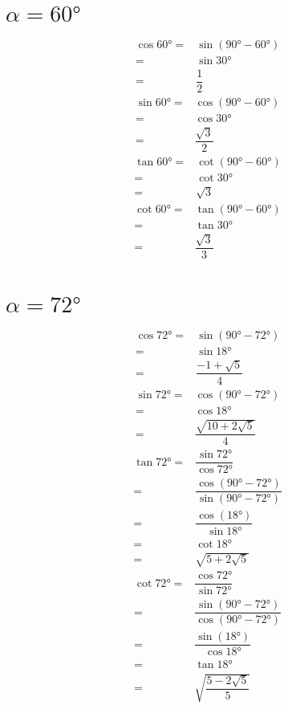 \section{$\alpha=\ang{60}$}
\begin{align*}
	\cos\ang{60}=&\sin(\ang{90}-\ang{60})\\
	=&\sin\ang{30}\\
	=&\dfrac{1}{2}
\end{align*}
\begin{align*}
	\sin\ang{60}=&\cos(\ang{90}-\ang{60})\\
	=&\cos\ang{30}\\
	=&\dfrac{\sqrt{3}}{2}
\end{align*}
\begin{align*}
	\tan\ang{60}=&\cot(\ang{90}-\ang{60})\\
	=&\cot\ang{30}\\
	=&\sqrt{3}
\end{align*}
\begin{align*}
	\cot\ang{60}=&\tan(\ang{90}-\ang{60})\\
	=&\tan\ang{30}\\
	=&\dfrac{\sqrt{3}}{3}\\
\end{align*}
\section{$\alpha=\ang{72}$}
\begin{align*}
	\cos\ang{72}=&\sin(\ang{90}-\ang{72})\\
	=&\sin\ang{18}\\
	=&\dfrac{-1+\sqrt{5}}{4}
\end{align*}
\begin{align*}
	\sin\ang{72}=&\cos(\ang{90}-\ang{72})\\
	=&\cos\ang{18}\\
	=&\dfrac{\sqrt{10+2\sqrt{5}}}{4}
\end{align*}
\begin{align*}
	\tan\ang{72}=&\dfrac{\sin\ang{72}}{\cos\ang{72}}\\
	=&\dfrac{\cos(\ang{90}-\ang{72})}{\sin(\ang{90}-\ang{72})}\\
	=&\dfrac{\cos(\ang{18})}{\sin\ang{18}}\\	
	=&\cot\ang{18}\\
	=&\sqrt{5+2\sqrt{5}}
\end{align*}
\begin{align*}
	\cot\ang{72}=&\dfrac{\cos\ang{72}}{\sin\ang{72}}\\
	=&\dfrac{\sin(\ang{90}-\ang{72})}{\cos(\ang{90}-\ang{72})}\\
	=&\dfrac{\sin(\ang{18})}{\cos\ang{18}}\\	
	=&\tan\ang{18}\\
	=&\sqrt{\dfrac{5-2\sqrt{5}}{5}}
\end{align*}
